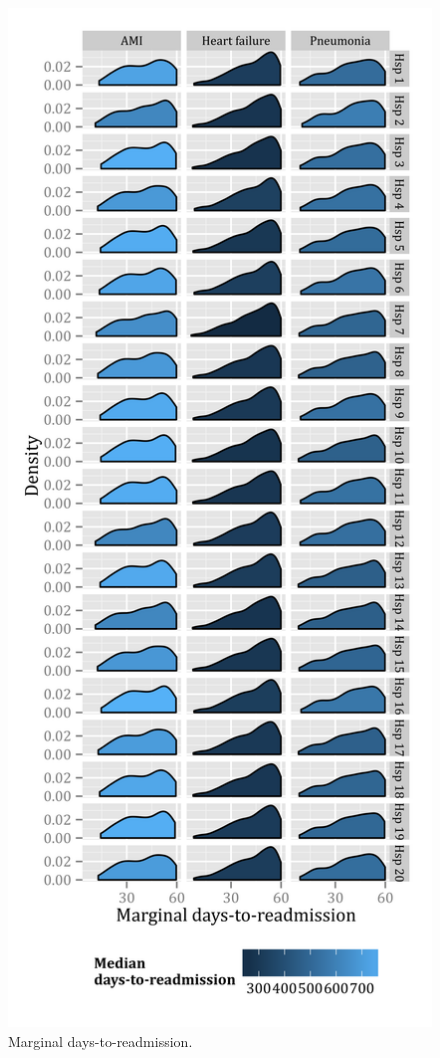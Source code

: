 \documentclass[]{article}\usepackage[]{graphicx}\usepackage[]{color}
\begin{document}

\begin{figure}[H]
    \centerline{
      \includegraphics{../figures/tte_distribution.png}
    }
    \caption[Marginal days-to-readmission.]
      {Marginal days-to-readmission.}
    \label{fig:marginal_days_to_readmission}
\end{figure}
\end{document}
